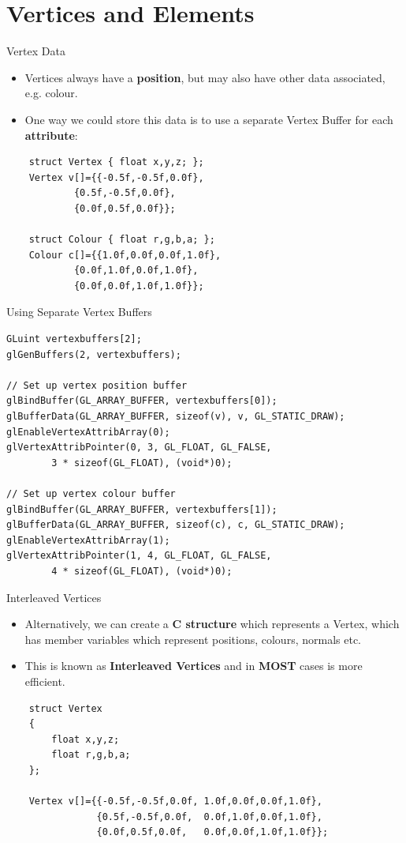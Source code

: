 \part{Vertices and Elements}
\frame{\partpage}

\begin{frame}[fragile]{Vertex Data}
	\begin{itemize}
		\pause\item Vertices  always have a \textbf{position}, but may also have other data associated, e.g. colour.
		\pause\item One way we could store this data is to use a separate Vertex Buffer for each \textbf{attribute}:
	\end{itemize}
	\pause\begin{lstlisting}
	struct Vertex { float x,y,z; };
	Vertex v[]={{-0.5f,-0.5f,0.0f},
			{0.5f,-0.5f,0.0f},
			{0.0f,0.5f,0.0f}};

	struct Colour { float r,g,b,a; };
	Colour c[]={{1.0f,0.0f,0.0f,1.0f},
			{0.0f,1.0f,0.0f,1.0f},
			{0.0f,0.0f,1.0f,1.0f}};
	\end{lstlisting}
\end{frame}

\begin{frame}[fragile]{Using Separate Vertex Buffers}
	\begin{lstlisting}
GLuint vertexbuffers[2];
glGenBuffers(2, vertexbuffers);

// Set up vertex position buffer
glBindBuffer(GL_ARRAY_BUFFER, vertexbuffers[0]);
glBufferData(GL_ARRAY_BUFFER, sizeof(v), v, GL_STATIC_DRAW);
glEnableVertexAttribArray(0);
glVertexAttribPointer(0, 3, GL_FLOAT, GL_FALSE,
		3 * sizeof(GL_FLOAT), (void*)0);

// Set up vertex colour buffer
glBindBuffer(GL_ARRAY_BUFFER, vertexbuffers[1]);
glBufferData(GL_ARRAY_BUFFER, sizeof(c), c, GL_STATIC_DRAW);
glEnableVertexAttribArray(1);
glVertexAttribPointer(1, 4, GL_FLOAT, GL_FALSE,
		4 * sizeof(GL_FLOAT), (void*)0);
	\end{lstlisting}
\end{frame}
	
\begin{frame}[fragile]{Interleaved Vertices}
	\begin{itemize}
		\pause\item Alternatively, we can create a \textbf{C structure} which represents a Vertex, which has member variables which represent positions, colours, normals etc.
		\pause\item This is known as \textbf{Interleaved Vertices} and in \textbf{MOST} cases is more efficient.
	\end{itemize}
	\pause\begin{lstlisting}
	struct Vertex
	{
		float x,y,z;
		float r,g,b,a;
	};
	
	Vertex v[]={{-0.5f,-0.5f,0.0f, 1.0f,0.0f,0.0f,1.0f},
				{0.5f,-0.5f,0.0f,  0.0f,1.0f,0.0f,1.0f},
				{0.0f,0.5f,0.0f,   0.0f,0.0f,1.0f,1.0f}};
	\end{lstlisting}
\end{frame}

